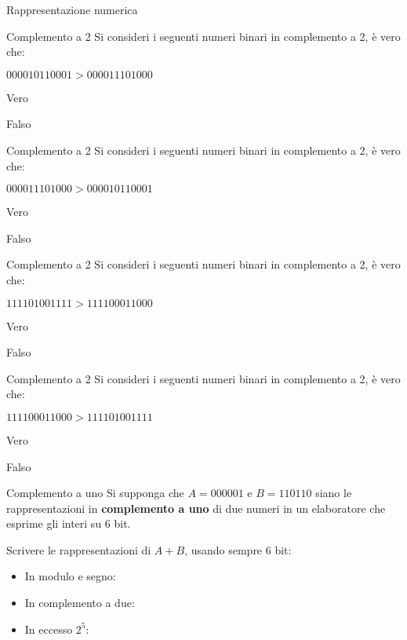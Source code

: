 \documentclass[11pt]{article}
\begin{document}
\begin{quiz}{Rappresentazione numerica}
\begin{multi}[points=1]{Complemento a 2}
Si consideri i seguenti numeri binari in complemento a 2, \`{e} vero che:

$000010110001 > 000011101000$

\item Vero
\item* Falso
\end{multi}


\begin{multi}[points=1]{Complemento a 2}
Si consideri i seguenti numeri binari in complemento a 2, \`{e} vero che:

$000011101000 > 000010110001$

\item* Vero
\item Falso
\end{multi}


\begin{multi}[points=1]{Complemento a 2}
Si consideri i seguenti numeri binari in complemento a 2, \`{e} vero che:

$111101001111 > 111100011000$

\item* Vero
\item Falso
\end{multi}


\begin{multi}[points=1]{Complemento a 2}
Si consideri i seguenti numeri binari in complemento a 2, \`{e} vero che:

$111100011000 > 111101001111$

\item Vero
\item* Falso
\end{multi}


\begin{cloze}[points=1,shuffle=false]{Complemento a uno}
Si supponga che $A = 000001$ e $B = 110110$ siano le rappresentazioni in \textbf{complemento a uno} di due numeri in un elaboratore che esprime gli interi su 6 bit.

Scrivere le rappresentazioni di $A+B$, usando sempre 6 bit:

\begin{itemize}
\item In modulo e segno: 
\item In complemento a due: 
\item In eccesso $2^5$: 
\end{itemize}
\end{cloze}


\end{quiz}
\end{document}
